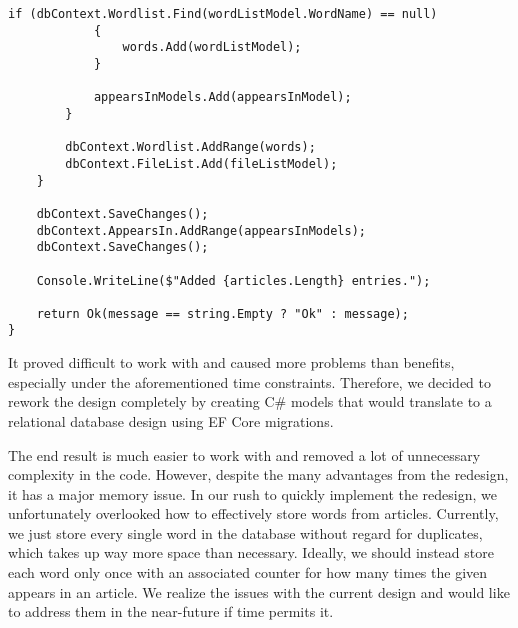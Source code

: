 \begin{lstlisting}[language=CSharp, caption={Old controller}, label={lst:old_controller}]
            if (dbContext.Wordlist.Find(wordListModel.WordName) == null)
            {
                words.Add(wordListModel);
            }

            appearsInModels.Add(appearsInModel);
        }

        dbContext.Wordlist.AddRange(words);
        dbContext.FileList.Add(fileListModel);
    }
        
    dbContext.SaveChanges();
    dbContext.AppearsIn.AddRange(appearsInModels);
    dbContext.SaveChanges();

    Console.WriteLine($"Added {articles.Length} entries.");

    return Ok(message == string.Empty ? "Ok" : message);
}
\end{lstlisting}

It proved difficult to work with and caused more problems than benefits, especially under the aforementioned time constraints. 
Therefore, we decided to rework the design completely by creating C\# models that would translate to a relational database design using EF Core migrations.

The end result is much easier to work with and removed a lot of unnecessary complexity in the code.
However, despite the many advantages from the redesign, it has a major memory issue.
In our rush to quickly implement the redesign, we unfortunately overlooked how to effectively store words from articles. 
Currently, we just store every single word in the database without regard for duplicates, which takes up way more space than necessary.
Ideally, we should instead store each word only once with an associated counter for how many times the given appears in an article.
We realize the issues with the current design and would like to address them in the near-future if time permits it.

